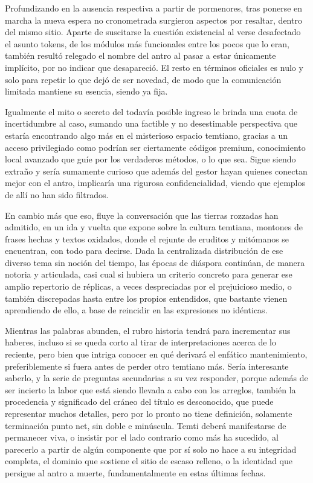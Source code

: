 \documentclass[
]{book}
\begin{document}
Profundizando en la ausencia respectiva a partir de pormenores, tras ponerse en marcha la nueva espera no cronometrada surgieron aspectos por resaltar, dentro del mismo sitio. Aparte de suscitarse la cuestión existencial al verse desafectado el asunto tokens, de los módulos más funcionales entre los pocos que lo eran, también resultó relegado el nombre del antro al pasar a estar únicamente implícito, por no indicar que desapareció. El resto en términos oficiales es nulo y solo para repetir lo que dejó de ser novedad, de modo que la comunicación limitada mantiene su esencia, siendo ya fija.

Igualmente el mito o secreto del todavía posible ingreso le brinda una cuota de incertidumbre al caso, sumando una factible y no desestimable perspectiva que estaría encontrando algo más en el misterioso espacio temtiano, gracias a un acceso privilegiado como podrían ser ciertamente códigos premium, conocimiento local avanzado que guíe por los verdaderos métodos, o lo que sea. Sigue siendo extraño y sería sumamente curioso que además del gestor hayan quienes conectan mejor con el antro, implicaría una rigurosa confidencialidad, viendo que ejemplos de allí no han sido filtrados.

En cambio más que eso, fluye la conversación que las tierras rozzadas han admitido, en un ida y vuelta que expone sobre la cultura temtiana, montones de frases hechas y textos oxidados, donde el rejunte de eruditos y mitómanos se encuentran, con todo para decirse. Dada la centralizada distribución de ese diverso tema sin noción del tiempo, las épocas de diáspora continúan, de manera notoria y articulada, casi cual si hubiera un criterio concreto para generar ese amplio repertorio de réplicas, a veces despreciadas por el prejuicioso medio, o también discrepadas hasta entre los propios entendidos, que bastante vienen aprendiendo de ello, a base de reincidir en las expresiones no idénticas.

Mientras las palabras abunden, el rubro historia tendrá para incrementar sus haberes, incluso si se queda corto al tirar de interpretaciones acerca de lo reciente, pero bien que intriga conocer en qué derivará el enfático mantenimiento, preferiblemente si fuera antes de perder otro temtiano más. Sería interesante saberlo, y la serie de preguntas secundarias a su vez responder, porque además de ser incierto la labor que está siendo llevada a cabo con los arreglos, también la procedencia y significado del cráneo del título es desconocido, que puede representar muchos detalles, pero por lo pronto no tiene definición, solamente terminación punto net, sin doble e minúscula. Temti deberá manifestarse de permanecer viva, o insistir por el lado contrario como más ha sucedido, al parecerlo a partir de algún componente que por sí solo no hace a su integridad completa, el dominio que sostiene el sitio de escaso relleno, o la identidad que persigue al antro a muerte, fundamentalmente en estas últimas fechas.
\end{document}
